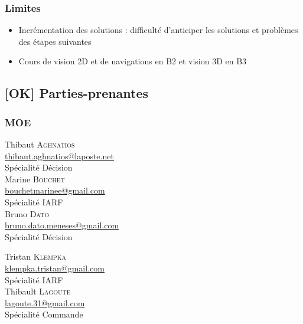 \documentclass[10pt,a4paper]{article}
\begin{document}
\subsubsection{Limites}
\begin{itemize}
\item Incrémentation des solutions : difficulté d'anticiper les solutions et problèmes des étapes suivantes
\item Cours de vision 2D et de navigations en B2 et vision 3D en B3
\end{itemize} 

\subsection{[OK] Parties-prenantes}

\subsubsection{MOE} 
\begin{minipage}[t]{0.30 \textwidth} 
Thibaut \textsc{Aghnatios} \\
\href{mailto:thibaut.aghnatios@laposte.net}{thibaut.aghnatios@laposte.net} \\
Spécialité Décision \\[0.3cm]
Marine \textsc{Bouchet} \\
\href{mailto:bouchetmarinee@gmail.com}{bouchetmarinee@gmail.com} \\
Spécialité IARF \\[0.3cm]
Bruno \textsc{Dato} \\
\href{mailto:bruno.dato.meneses@gmail.com}{bruno.dato.meneses@gmail.com} \\
Spécialité Décision
\end{minipage} 
\hfill
\begin{minipage}[t]{0.46\textwidth} 
Tristan \textsc{Klempka} \\
\href{mailto:klempka.tristan@gmail.com}{klempka.tristan@gmail.com} \\
Spécialité IARF \\[0.3cm]
Thibault \textsc{Lagoute} \\
\href{mailto:lagoute.31@gmail.com}{lagoute.31@gmail.com}   \\
Spécialité Commande
\end{minipage} 
\end{document}
